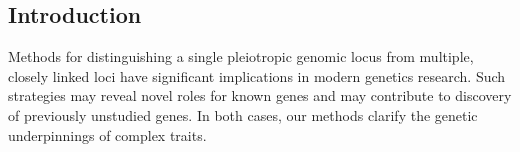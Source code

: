 \documentclass[a0,landscape]{a0poster}
\begin{document}
\begin{multicols}{4} %


\color{Navy} %





\color{SaddleBrown} %
\section*{Introduction}

Methods for distinguishing a single pleiotropic genomic locus from multiple, closely linked loci have significant implications in modern genetics research. Such strategies may reveal novel roles for known genes and may contribute to discovery of previously unstudied genes. In both cases, our methods clarify the genetic underpinnings of complex traits. 



\end{multicols}
\end{document}
